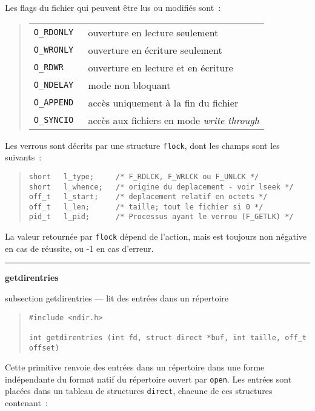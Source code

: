 \documentclass [twoside] {report}
\newcommand {\primitive} [1]
    {
	{\large \bf #1}
	\addcontentsline {toc} {subsection} {#1}
    }
\newcommand {\separation}
    {
	\vspace {7mm}
	\nopagebreak
	\hrule
    }
\begin{document}
Les flags du fichier qui peuvent être lus ou modifiés sont~:

{\small
\begin {quote}
    \begin {tabular} {|ll|} \hline
	\tt O\_RDONLY & ouverture en lecture seulement \\
	\tt O\_WRONLY & ouverture en écriture seulement \\
	\tt O\_RDWR & ouverture en lecture et en écriture \\
	\tt O\_NDELAY & mode non bloquant \\
	\tt O\_APPEND & accès uniquement à la fin du fichier \\
	\tt O\_SYNCIO & accès aux fichiers en mode {\em write through}
	    \\ \hline
    \end {tabular}
\end {quote}
}

Les verrous sont décrits par une structure {\tt flock}, dont les champs
sont les suivants~:

\begin {quote}
\begin {verbatim}
short   l_type;     /* F_RDLCK, F_WRLCK ou F_UNLCK */
short   l_whence;   /* origine du deplacement - voir lseek */
off_t   l_start;    /* deplacement relatif en octets */
off_t   l_len;      /* taille; tout le fichier si 0 */
pid_t   l_pid;      /* Processus ayant le verrou (F_GETLK) */
\end{verbatim}
\end {quote}

La valeur retournée par {\tt flock} dépend de l'action, mais est
toujours non négative en cas de réussite, ou
-1 en cas d'erreur.




\separation
\primitive {getdirentries} --- lit des entrées dans un répertoire

\begin {quote}
\begin {verbatim}
#include <ndir.h>

int getdirentries (int fd, struct direct *buf, int taille, off_t offset)
\end{verbatim}
\end {quote}

Cette primitive renvoie des entrées dans un répertoire dans une
forme indépendante du format natif du répertoire ouvert par {\tt open}.
Les entrées sont placées dans un tableau de structures {\tt direct},
chacune de ces structures contenant~:
\end{document}
